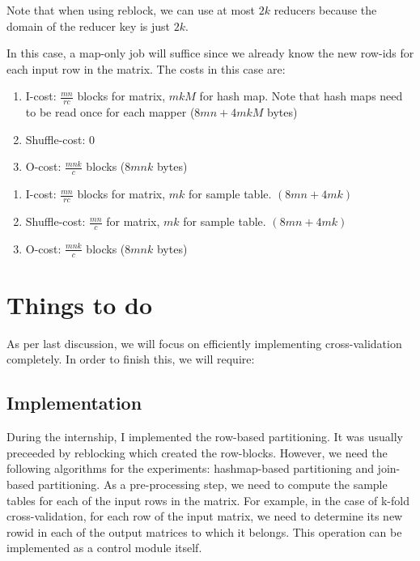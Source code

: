 \documentclass{vldb}
\newcommand{\eat}[1]{} %
\newcommand{\topic}[1]{\par \smallskip \smallskip \noindent{\bf \uline{#1}}}
\newcommand{\topicnoul}[1]{\par \smallskip \smallskip \noindent{\bf {#1}}}
\begin{document}
\noindent Note that when using reblock, we can use at most $2k$ reducers because
the domain of the reducer key is just $2k$.

\topicnoul{Using hashmap:}
In this case, a  map-only job will suffice since we already know the new row-ids
for each input row in the matrix. The costs in this case are:

\begin{enumerate}
\item I-cost: $\frac{mn}{rc}$ blocks for matrix, $mkM$ for hash map. Note that
hash maps need to be read once for each mapper ($8mn + 4mkM$ bytes)
\item Shuffle-cost: 0
\item O-cost: $\frac{mnk}{c}$ blocks ($8mnk$ bytes)
\end{enumerate}

\topicnoul{Using Joins:}
\begin{enumerate}
\item I-cost: $\frac{mn}{rc}$ blocks for matrix, $mk$ for sample table. $(8mn +
4mk)$
\item Shuffle-cost: $\frac{mn}{c}$ for matrix, $mk$ for sample table. $(8mn +
4mk)$
\item O-cost: $\frac{mnk}{c}$ blocks ($8mnk$ bytes)
\end{enumerate}


\eat{
\topic{Cost model} \\
Assume an $m\times n$ matrix with $r\times c$ block size. We compute the number
of key-value pairs emitted and the state maintained by the mapper and reducer
phases.
\hspace*{-0.3in}
}

\section{Things to do}
As per last discussion, we will focus on efficiently implementing
cross-validation completely. In order to finish this, we will require:
\subsection{Implementation}
During the internship, I implemented the row-based partitioning. It was usually
preceeded by reblocking which created the row-blocks. However, we need the
following algorithms for the experiments: hashmap-based partitioning and
join-based partitioning. As a pre-processing step, we need to compute the sample
tables for each of the input rows in the matrix. For example, in the case of
k-fold cross-validation, for each row of the input matrix, we need to determine
its new rowid in each of the output matrices to which it belongs. This operation
can be implemented as a control module itself.
\end{document}
